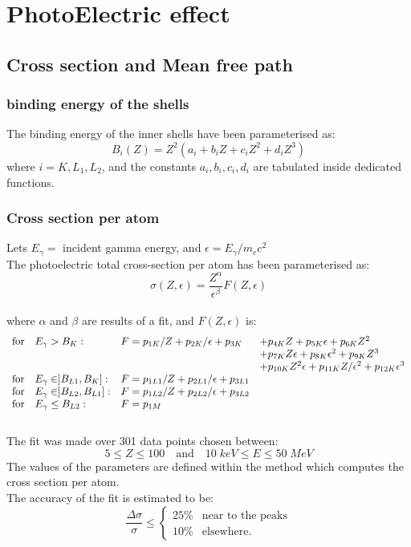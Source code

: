 
\chapter[PhotoElectric effect]{PhotoElectric effect}
\section{Cross section and Mean free path}

\subsection{binding energy of the shells} 
The binding energy of the inner shells have been parameterised as:
\[
   B_i (Z) = Z^2 (a_i + b_i Z + c_i Z^2 + d_i Z^3 )  
\]
where $ i = K, L_1, L_2 $, and the constants $a_i, b_i, c_i,d_i$
are tabulated inside dedicated functions.

\subsection{Cross section per atom}
Lets $E_{\gamma} =$ incident gamma energy, and $\epsilon = E_{\gamma}/m_{e}c^2 $ \\
The photoelectric total cross-section per atom has been parameterised as:
\[
   \sigma(Z,\epsilon)=\frac{Z^{\alpha}} {\epsilon^{\beta}} F(Z,\epsilon)
\]
\\ 
where $\alpha$ and $\beta$ are results of a fit, and $F(Z,\epsilon)$ is:
\[
  \begin{array}{lll}
  \mbox{for\quad} E_{\gamma} > B_K: & F=  p_{1K }/Z  + p_{2K }/\epsilon  + p_{3K } 
                           & + p_{4K }Z + p_{5K }\epsilon +p_{6K } Z^2 \\
                       & & + p_{7K }Z\epsilon + p_{8K }\epsilon^2 + p_{9K }Z^3 \\                          
       & & + p_{10K} Z^2\epsilon + p_{11K} Z/\epsilon^2 + p_{12K}\epsilon^3 \\
  \mbox{for\quad} E_{\gamma} \in ]B_{L1}, B_K]: &
                                   F= p_{1L1}/Z + p_{2L1}/\epsilon + p_{3L1} \\
  \mbox{for\quad} E_{\gamma} \in ]B_{L2}, B_{L1}]: &                                    
                                   F= p_{1L2}/Z + p_{2L2}/\epsilon + p_{3L2} \\
  \mbox{for\quad} E_{\gamma} \leq B_{L2}: & F= p_{1M}
  \end{array}
\]
\\ 
The fit was made over 301 data points chosen between:
\[5 \leq Z \leq 100\quad \mbox{and} \quad 10 \; keV \leq E \leq 50\; MeV \]
The values of the parameters are defined within the method which computes the
cross section per atom. \\
The accuracy of the fit is estimated to be:
\begin{displaymath}
 \frac{\Delta \sigma}{\sigma} \leq 
    \left\{
        \begin{array}{ll} 25\% & \mbox{near to the peaks} \\
                          10\% & \mbox{elsewhere.}
         \end{array}
    \right.
\end{displaymath}

